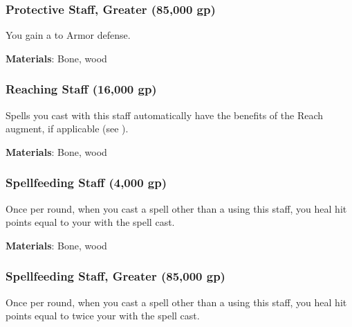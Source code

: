 \lowercase{\hypertarget{item:Protective Staff, Greater}{}}\label{item:Protective Staff, Greater}
\hypertarget{item:Protective Staff, Greater}{\subsubsection{Protective Staff, Greater\hfill{} (85,000 gp)}}

You gain a   to Armor defense.



\textbf{Materials}: Bone, wood


\lowercase{\hypertarget{item:Reaching Staff}{}}\label{item:Reaching Staff}
\hypertarget{item:Reaching Staff}{\subsubsection{Reaching Staff\hfill{} (16,000 gp)}}

Spells you cast with this staff automatically have the benefits of the Reach augment, if applicable (see ).



\textbf{Materials}: Bone, wood


\lowercase{\hypertarget{item:Spellfeeding Staff}{}}\label{item:Spellfeeding Staff}
\hypertarget{item:Spellfeeding Staff}{\subsubsection{Spellfeeding Staff\hfill{} (4,000 gp)}}

Once per round, when you cast a spell other than a  using this staff,
you heal hit points equal to your  with the spell cast.



\textbf{Materials}: Bone, wood


\lowercase{\hypertarget{item:Spellfeeding Staff, Greater}{}}\label{item:Spellfeeding Staff, Greater}
\hypertarget{item:Spellfeeding Staff, Greater}{\subsubsection{Spellfeeding Staff, Greater\hfill{} (85,000 gp)}}

Once per round, when you cast a spell other than a  using this staff,
you heal hit points equal to twice your  with the spell cast.



